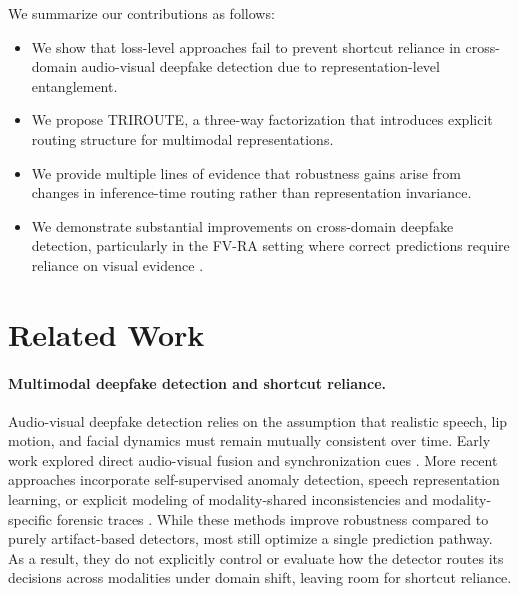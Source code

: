 \documentclass{article}
\begin{document}
We summarize our contributions as follows:
\begin{itemize}
    \item We show that loss-level approaches fail to prevent shortcut reliance in cross-domain audio-visual deepfake detection due to representation-level entanglement.
    
    \item We propose TRIROUTE, a three-way factorization that introduces explicit routing structure for multimodal representations.
    
    \item We provide multiple lines of evidence that robustness gains arise from changes in inference-time routing rather than representation invariance.
    
    \item We demonstrate substantial improvements on cross-domain deepfake detection, particularly in the FV-RA setting where correct predictions require reliance on visual evidence \citep{khalid2021fakeavceleb, cai2024avdeepfake1m}.
\end{itemize}


\section{Related Work}

\paragraph{Multimodal deepfake detection and shortcut reliance.}
Audio-visual deepfake detection relies on the assumption that realistic speech, lip motion, and facial dynamics must remain mutually consistent over time. Early work explored direct audio-visual fusion and synchronization cues \citep{zhou2021jointav, chung2016syncnet}. More recent approaches incorporate self-supervised anomaly detection, speech representation learning, or explicit modeling of modality-shared inconsistencies and modality-specific forensic traces \citep{feng2023avad, liang2024speechforensics, smeu2025avhalign, du2025cad}. 
While these methods improve robustness compared to purely artifact-based detectors, most still optimize a single prediction pathway. As a result, they do not explicitly control or evaluate how the detector routes its decisions across modalities under domain shift, leaving room for shortcut reliance.
\end{document}
